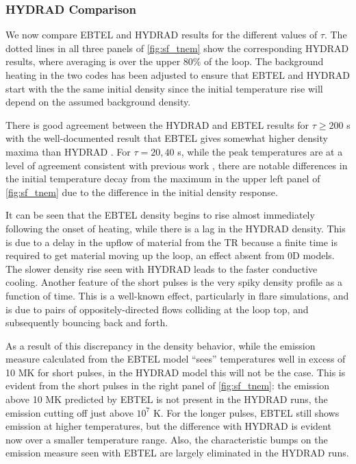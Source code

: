 \documentclass[iop]{emulateapj}
\begin{document}
	\subsubsection{HYDRAD Comparison}
	\label{subsubsec:hydrad_comparison_sf}
		\par We now compare EBTEL and HYDRAD results for the different values of $\tau$. The dotted lines in all three panels of \autoref{fig:sf_tnem} show the corresponding HYDRAD results, where averaging is over the upper 80\% of the loop. The background heating in the two codes has been adjusted to ensure that EBTEL and HYDRAD start with the the same initial density since the initial temperature rise will depend on the assumed background density.
		\par There is good agreement between the HYDRAD and EBTEL results for $\tau\ge200$ s with the well-documented result that EBTEL gives somewhat higher density maxima than HYDRAD \citep[see][]{cargill_enthalpy-based_2012}. For $\tau=20,40$ s, while the peak temperatures are at a level of agreement consistent with previous work \citep{cargill_enthalpy-based_2012}, there are notable differences in the initial temperature decay from the maximum in the upper left panel of \autoref{fig:sf_tnem} due to the difference in the initial density response. 
	\par It can be seen that the EBTEL density begins to rise almost immediately following the onset of heating, while there is a lag in the HYDRAD density. This is due to a delay in the upflow of material from the TR because a finite time is required to get material moving up the loop, an effect absent from 0D models. The slower density rise seen with HYDRAD leads to the faster conductive cooling. Another feature of the short pulses is the very spiky density profile as a function of time. This is a well-known effect, particularly in flare simulations, and is due to pairs of oppositely-directed flows colliding at the loop top, and subsequently bouncing back and forth.
	\par As a result of this discrepancy in the density behavior, while the emission measure calculated from the EBTEL model ``sees'' temperatures well in excess of 10 MK for short pulses, in the HYDRAD model this will not be the case. This is evident from the short pulses in the right panel of \autoref{fig:sf_tnem}: the emission above 10 MK predicted by EBTEL is not present in the HYDRAD runs, the emission cutting off just above $10^7$ K. For the longer pulses, EBTEL still shows emission at higher temperatures, but the difference with HYDRAD is evident now over a smaller temperature range. Also, the characteristic bumps on the emission measure seen with EBTEL are largely eliminated in the HYDRAD runs. 
\end{document}

